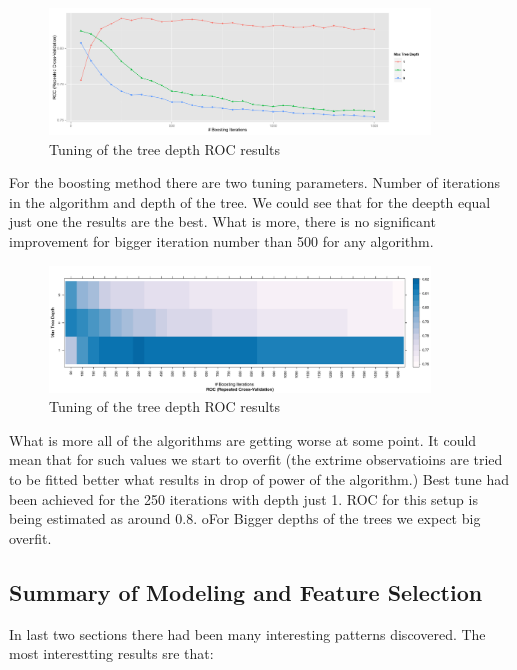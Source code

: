 \documentclass[10pt]{article}\usepackage[]{graphicx}\usepackage[]{color}
\begin{document}
\clearpage 

\begin{figure}[h!]
  \centering
  \includegraphics[width=0.9\textwidth]{Plots/TUNE_GBM}
  \caption
   {Tuning of the tree depth ROC results}
\end{figure}

For the boosting method there are two tuning parameters. Number of iterations in the algorithm and depth of the tree. We could see that for the deepth equal just one the results are the best. What is more, there is no significant improvement for bigger  iteration number than 500 for any algorithm. 

\begin{figure}[h!]
  \centering
  \includegraphics[width=0.9\textwidth]{Plots/TUNE_GBM_1}
  \caption
   {Tuning of the tree depth ROC results}
\end{figure}
  
What is more all of the algorithms are getting worse at some point. It could mean that for such values we start to overfit (the extrime observatioins are tried to be fitted better what results in drop of power of the algorithm.)
Best tune had been achieved for the 250 iterations with depth just 1. ROC for this setup is being estimated as around 0.8. oFor Bigger depths of the trees we expect big overfit. 

\clearpage

\subsection{Summary of Modeling and Feature Selection}

In last two sections there had been many interesting patterns discovered. The most interestting results sre that:
\end{document}
